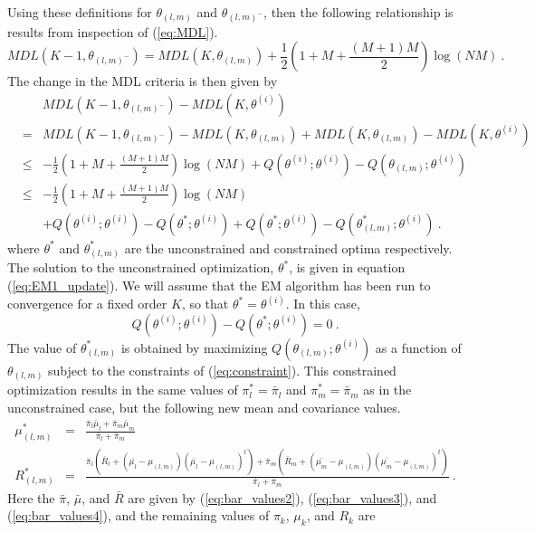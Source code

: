\documentclass[12pt]{article}
\begin{document}
Using these definitions for $\theta_{(l,m)}$ and $\theta_{(l,m)^-}$,
then the following relationship is results from inspection of (\ref{eq:MDL}).
$$
MDL(K-1,\theta_{(l,m)^-}) = MDL(K,\theta_{(l,m)}) 
+ \frac{1}{2} \left(1 + M + \frac{(M+1)M}{2}\right) \log (NM)  \ .
$$
The change in the MDL criteria is then given by
\begin{eqnarray*}
&& MDL(K-1,\theta_{(l,m)^-}) - MDL(K,\theta^{(i)}) \\
&=& MDL(K-1,\theta_{(l,m)^-}) - MDL(K,\theta_{(l,m)}) 
  + MDL(K,\theta_{(l,m)}) - MDL(K,\theta^{(i)})\\
&\leq&  - \frac{1}{2} \left(1 + M + \frac{(M+1)M}{2}\right) \log (NM)
  + Q(\theta^{(i)};\theta^{(i)}) - Q(\theta_{(l,m)};\theta^{(i)})\\
&\leq&  - \frac{1}{2} \left(1 + M + \frac{(M+1)M}{2}\right) \log (NM)\\
&& + Q(\theta^{(i)};\theta^{(i)}) - Q(\theta^*;\theta^{(i)}) 
  + Q(\theta^*;\theta^{(i)}) - Q(\theta^*_{(l,m)};\theta^{(i)})\ .
\end{eqnarray*}
where $\theta^*$ and $\theta^*_{(l,m)}$ are the unconstrained 
and constrained optima respectively.
The solution to the unconstrained optimization, $\theta^*$,
is given in equation (\ref{eq:EM1_update}).
We will assume that the EM algorithm has been run to convergence
for a fixed order $K$, so that $\theta^*=\theta^{(i)}$.
In this case, 
$$
Q(\theta^{(i)};\theta^{(i)}) - Q(\theta^*;\theta^{(i)}) = 0 \ .
$$
The value of $\theta^*_{(l,m)}$ is obtained 
by maximizing $Q(\theta_{(l,m)};\theta^{(i)})$
as a function of $\theta_{(l,m)}$ subject 
to the constraints of (\ref{eq:constraint}).
This constrained optimization results in the same values 
of $\pi^*_l=\bar{\pi}_l$ and $\pi^*_m=\bar{\pi}_m$
as in the unconstrained case, 
but the following new mean and covariance values.
\begin{eqnarray}
\label{eq:param_add2}
\mu_{(l,m)}^* &=& \frac{\bar{\pi}_l \bar{\mu}_l + \bar{\pi}_m \bar{\mu}_m}
             { \bar{\pi}_l + \bar{\pi}_m} \\
\label{eq:param_add3}
R_{(l,m)}^* &=& \frac{
\bar{\pi}_l \left( \bar{R}_l + (\bar{\mu_l} - \mu_{(l,m)}) (\bar{\mu_l} - \mu_{(l,m)})^t\right) 
+ \bar{\pi}_m \left( \bar{R}_m + (\bar{\mu_m} - \mu_{(l,m)}) (\bar{\mu_m} - \mu_{(l,m)})^t\right) 
}{ \bar{\pi}_l + \bar{\pi}_m} \ .
\end{eqnarray}
Here the $\bar{\pi}$, $\bar{\mu}$, and $\bar{R}$
are given by (\ref{eq:bar_values2}), (\ref{eq:bar_values3}), 
and (\ref{eq:bar_values4}),
and the remaining values of $\pi_k$, $\mu_k$, and $R_k$ are
\end{document}

